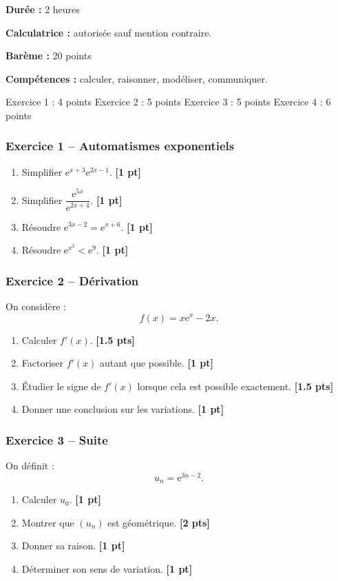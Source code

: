 \documentclass[11pt,a4paper]{article}
\newcommand{\e}{\mathrm{e}}
\newcommand{\pts}[1]{\hfill \textbf{[#1 pt]}}
\newcommand{\ptss}[1]{\hfill \textbf{[#1 pts]}}
\newcommand{\competences}[1]{\textbf{Compétences :} #1}
\newcommand{\calculatrice}{\textbf{Calculatrice :} autorisée sauf mention contraire.}
\newcommand{\duree}[1]{\textbf{Durée :} #1}
\newcommand{\bareme}[1]{\textbf{Barème :} #1}
\begin{document}
\begin{sujetbox}
\duree{2 heures}

\calculatrice

\bareme{20 points}

\competences{calculer, raisonner, modéliser, communiquer.}
\end{sujetbox}

\begin{baremebox}
Exercice 1 : 4 points \quad
Exercice 2 : 5 points \quad
Exercice 3 : 5 points \quad
Exercice 4 : 6 points
\end{baremebox}

\subsubsection*{Exercice 1 -- Automatismes exponentiels}

\begin{enumerate}
    \item Simplifier $\e^{x+3}\e^{2x-1}$. \pts{1}
    \item Simplifier $\dfrac{\e^{5x}}{\e^{2x+4}}$. \pts{1}
    \item Résoudre $\e^{3x-2}=\e^{x+6}$. \pts{1}
    \item Résoudre $\e^{x^2}<\e^9$. \pts{1}
\end{enumerate}

\subsubsection*{Exercice 2 -- Dérivation}

On considère :
\[
f(x)=x\e^x-2x.
\]
\begin{enumerate}
    \item Calculer $f'(x)$. \ptss{1.5}
    \item Factoriser $f'(x)$ autant que possible. \pts{1}
    \item Étudier le signe de $f'(x)$ lorsque cela est possible exactement. \ptss{1.5}
    \item Donner une conclusion sur les variations. \pts{1}
\end{enumerate}

\subsubsection*{Exercice 3 -- Suite}

On définit :
\[
u_n=\e^{3n-2}.
\]
\begin{enumerate}
    \item Calculer $u_0$. \pts{1}
    \item Montrer que $(u_n)$ est géométrique. \ptss{2}
    \item Donner sa raison. \pts{1}
    \item Déterminer son sens de variation. \pts{1}
\end{enumerate}
\end{document}
